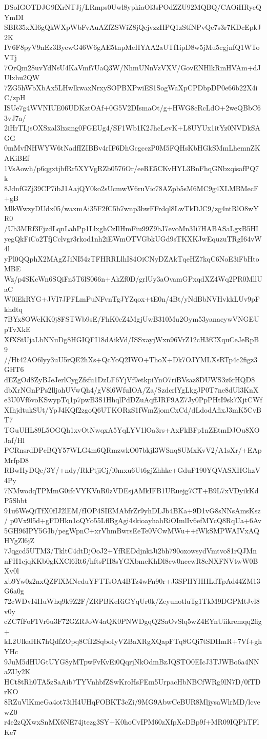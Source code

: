 DSoIGOTDJG9fXrNTJj/LRmps0Uwl8ypkiaOl3sPOdZZU92MQBQ/CAOiHRyeQYmDI
SBR35xXI6gQkWXpWbFvAuAZfZSWiZ8jQcjvzzHPQ1zStfNPvQe7s3r7KDcEpkJ2K
IV6F8pyV9nEz3ByewG46W6gAE5tnpMeHYAA2aUTf1ipD8w5jMu5cgjnfQ1WToVTj
7OrQm28uvYdNsU4KaVmf7UaQ3W/NhmUNnVzVXV/GovENHlkRmHVAm+dJUlxhu2QW
7ZG5hWbXbAx5LHwlkwaxNrxySOPBXPwiES1SogWaXpCPDbpDP0e66b22X4iC/zpH
ISUe7g4WVNIUE06UDKztOAf+0G5V2DIsmaOt/g+HWG8cRcLdO+2weQBbC63vJ7a/
2iHrTLjsOXSxal3lxsmg0FGEUg4/SF1Wb1K2JhcLevK+L8UYUx1itYz0NVDkSAGG
0mMvfNHWYW6tNadfIZIBBv4rIF6DhGcgcczP0M5FQHsKbHGkSMmLhemnZKAKiBEf
1VsAowh/p6qgxtjbfRr5XYVgRZb0576Or/eeRE5CKvHYL3BnFhqGNbxqisafPQ7k
8JdnfGZj39CP7ibJ1AajQY0ko2sUcmwW6ruVic78AZpb5sM6MC9g4XLMBMecF+gB
MlkWwzyDUdx05/waxmAi35F2fC5b7wnp3bwFFrdql8LwTkDJC9/zg4ntRlO8wYR0
/Uh3MRf3FjzdLqnLahPp1LlxghCzIlHmFiu99Z9hJ7evoMn3Ii7HABASaLgxB5HI
yegQkFiCo2TfjCclvgr3rkod1nh2iEWmOTVGbkUGd9sTKXKJwEquzuTRgI64vW4l
yPl0QQphX2MAgZJiNI54zTFHRRLlhI84OiCNyDZAkTqeHZ7kqC6NoE3iFbHtoMBE
Wz/p4SKcWn6SQiFn5T6lS066n+AkZf0D/grlUy3aOvamGPxqdXZ4Wq2PR0MllUaC
W0lEkRYG+JVI7JPFLmPuNFvnTgJYZqox+tE0n/4Bt/yNdBbNVHvkkLUv9pFkhdtq
7BYx8OWeKK0j8FSTWb9sE/FhK0eZ4MgjUwB310Mu2Oym53yanaeywVNGEUpTvXkE
XfXStUjaLbNNuDg8HGIQFI18dAikVd/ISSxayjWxn96VrZ12cH3fCXquCeJeRpB9
//Ht42AO6lyy3uU5rQE2hXs+QcYoQ2IWO+ThoX+Dk7OJYMLXsRTp4c2figz3GHT6
dEZgOd8ZyBJeJerlCygZfsfu1DzLF6YjVf9etkpiYnO7riBVsaz8DUWS3z6rHQD8
dbXrNGnPPs2lljohUVwQh4/gV8l6WfuIOA/Za/SzdcrlYgLkgJP0T7ne8dUl3KnX
e3U0Vf6voKSwypTq1p7pwB3S1HhqlPdDZuAqffJRF9AZ7Jy0PpPHtI9sk7XjtCWf
XIhjdtukSUt/YpJ4KQf2zgoQ6UTKORzS1fWmZjomCxCd/dLdodAfixJ3mK5CvBT7
TGuUHL89L5OGQh1xvOtNwqxA5YqLYV1lOa3rs+AxFkBFp1nZEtmDJOu8XOJaf/Hl
PCRnsrdDPcBQY57WLG4m6QRmzwkO07bkjI3WSnq8UMxKvV2/A1sXr/+EApMrfpD8
RBwHyDQe/3Y/+ndy/RkPtjiCj/i0mxu6Ut6gjZhhke+GduF190YQVASXHGhzV4Py
7NMwodqTPMmG0ifcVYKVnR0zVDEsjAMkIFB1URuejg7CT+B9L7xVDyikKdP5Shbt
91u6WeQiTfX0fIJ2lEM/fIOP4SIEMAbfrZr9yhDLJb4BKa+9D1vG8sNNsAmsKsz/
p0Vx9l5d+gFDHkn1oQYo55LflBgAgi4skioayhahRiOImlIv6efMYcQ8RqUa+6Av
5GH96IPY5GIb/pegWpnC+xrVhmBwrsEeTe0VCwMWu++fWkSMPWAIVxAQHYgZl6jZ
7Jqgcd5UTM3/TkltC4dtDjOoJ2+YfREDdjnkiJi2bh790oxowsydVmtvo81rQJMn
nFH1cjqKKb0gKXCl6Rt6/hftsPH8sYGXbmeKhDl8cw0nccwR8eNXFNVtwW0BXv0l
xb9Yw0z2nxQZFlXMNcduYFTTsOA4BTz4wFn90r+J3SPHYHHLdTpAd44ZM13G6a0g
72cWDvI4HuWhq9k9Z2F/ZRPBKeRiGYqUr0k/ZeyunotluTg1TkM9DGPMtJvl8v0y
cZC7fFoF1Vr6u3F72GZRJoW4aQK0PNWDgqQ2SaOvSlq5wZ4EYnUiikremqq2fig+
kL2UlkaHK7hQdfZOpq8CfI2SqboIyVZBaXRgXQapFTq8GQi7tSDHmR+7Vf+ghYHc
9JuM5dHUGtUYG8yMTpwFvKvEi0QqrjNkOdmBzJQSTO0EIcJ3TJWBo6a4NNaZUy2K
HCt8tRh0TA5zSaAib7TYVnhbfZSwKroHsFEm5UrpacHbNBCfWRg9lN7D/0fTDrKO
8RZuVlKmeGa4ot73iH4UHqFOBKT3cZi/9MG9AbwCeBUR8MljysaWlrMD/lcvewZ0
r4e2zQXwxSnMX6NE74jtezg3SY+K0hoCvIPM60zXfpXcDBp9f+MR09IQPhTFlKe7
